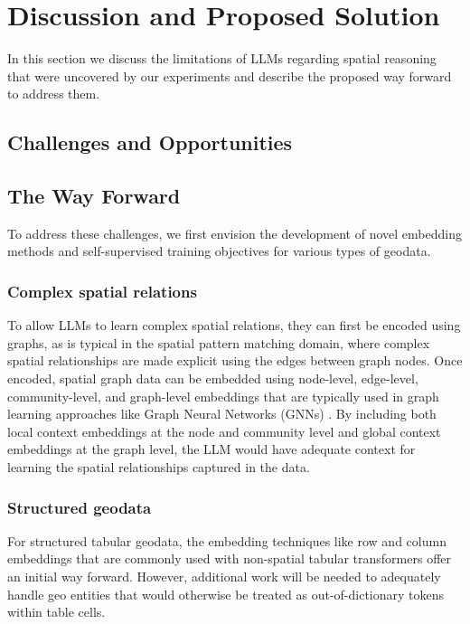 \section{Discussion and Proposed Solution}
\label{section:proposal}

In this section we discuss the limitations of LLMs regarding spatial reasoning that were uncovered by our experiments and describe the proposed way forward to address them.

\subsection{Challenges and Opportunities}

\subsection{The Way Forward}
To address these challenges, we first envision the development of novel embedding methods and self-supervised training objectives for various types of geodata.
%
\subsubsection{Complex spatial relations}
To allow LLMs to learn complex spatial relations, they can first be encoded using graphs, as is typical in the spatial pattern matching domain, where complex spatial relationships are made explicit using the edges between graph nodes.
Once encoded, spatial graph data can be embedded using node-level, edge-level, community-level, and graph-level embeddings that are typically used in graph learning approaches like Graph Neural Networks (GNNs) .
By including both local context embeddings at the node and community level and global context embeddings at the graph level, the LLM would have adequate context for learning the spatial relationships captured in the data.

\subsubsection{Structured geodata}
For structured tabular geodata, the embedding techniques like row and column embeddings that are commonly used with non-spatial tabular transformers offer an initial way forward.
However, additional work will be needed to adequately handle geo entities that would otherwise be treated as out-of-dictionary tokens within table cells.

